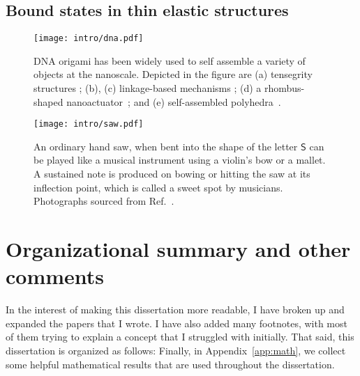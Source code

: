 \subsection{Bound states in thin elastic structures}

%
\begin{figure}
  \begin{center}
    \texttt{[image: intro/dna.pdf]}
  \end{center}
  \caption{DNA origami has been widely used to self assemble a variety of objects at the nanoscale.
Depicted in the figure are (a) tensegrity structures \cite{liedl2010}; (b), (c) linkage-based mechanisms \cite{marras2015,zhou2015}; (d) a rhombus-shaped nanoactuator~\cite{ke2016}; and (e) self-assembled polyhedra~\cite{iinuma2014}.}
  \label{fig:dna_origami}
\end{figure}

\begin{figure}
  \begin{center}
    \texttt{[image: intro/saw.pdf]}
  \end{center}
  \caption{%
    An ordinary hand saw, when bent into the shape of the letter $\mathsf{S}$ can be played like a musical instrument using a violin's bow or a mallet.
    A sustained note is produced on bowing or hitting the saw at its inflection point, which is called a sweet spot by musicians.
    Photographs sourced from Ref.~\cite{shankar2022}.
  }
  \label{fig:saw}
\end{figure}

\section{Organizational summary and other comments}

In the interest of making this dissertation more readable, I have broken up and expanded the papers that I wrote.
I have also added many footnotes, with most of them trying to explain a concept that I struggled with initially.
That said, this dissertation is organized as follows:
Finally, in Appendix~\ref{app:math}, we collect some helpful mathematical results that are used throughout the dissertation.
